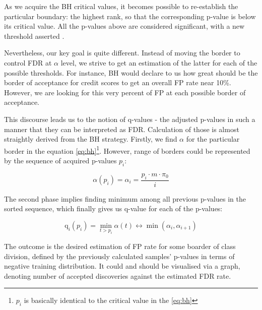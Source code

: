 \documentclass{article}
\begin{document}
As we acquire the BH critical values, it becomes possible to re-establish the particular boundary: the highest rank, so that the corresponding p-value is below its critical value. All the p-values above are considered significant, with a new threshold asserted \cite{qvalues}.

Nevertheless, our key goal is quite different. Instead of moving the border to control FDR at $\alpha$ level, we strive to get an estimation of the latter for each of the possible thresholds. For instance, BH would declare to us how great should be the border of acceptance for credit scores to get an overall FP rate near 10\%. However, we are looking for this very percent of FP at each possible border of acceptance. 

This discourse leads us to the notion of q-values - the adjusted p-values in such a manner that they can be interpreted as FDR. Calculation of those is almost straightly derived from the BH strategy. Firstly, we find $\alpha$ for the particular border in the equation \ref{eq:bh}\footnote{$p_i$ is basically identical to the critical value in the \ref{eq:bh}}. However, range of borders could be represented by the sequence of acquired p-values $p_i$:

\begin{equation}\label{eq:bh2}
    \alpha(p_i) = \alpha_i = \frac{p_i \cdot m \cdot \pi_0}{i}
\end{equation}

The second phase implies finding minimum among all previous p-values in the sorted sequence, which finally gives us q-value for each of the p-values:

    \begin{equation}\label{eq:q}
        \text{q}_{i}(p_{i}) = \min\limits_{t>p_{i}}\alpha(t) \leftrightarrow \min(\alpha_i, \alpha_{i+1})
    \end{equation}

The outcome is the desired estimation of FP rate for some boarder of class division, defined by the previously calculated samples' p-values in terms of negative training distribution. It could and should be visualised via a graph, denoting number of accepted discoveries against the estimated FDR rate. 
\end{document}
